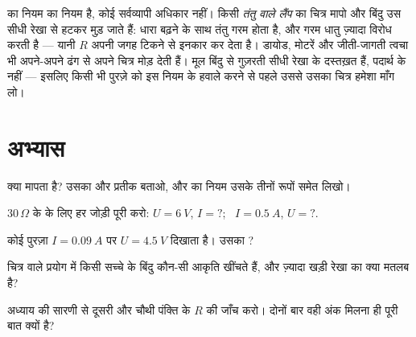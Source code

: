 \begin{remark}[नियम का राज कहाँ ख़त्म होता है]\label{rem:g8:ohms-law:limits}
 का नियम  का नियम है, कोई सर्वव्यापी अधिकार नहीं। किसी
\emph{तंतु वाले लैंप} का चित्र मापो और बिंदु उस सीधी रेखा से हटकर मुड़
जाते हैं: धारा बढ़ने के साथ तंतु गरम होता है, और गरम धातु ज़्यादा
विरोध करती है --- यानी $R$ अपनी जगह टिकने से इनकार कर देता है।
डायोड, मोटरें और जीती-जागती त्वचा भी अपने-अपने ढंग से अपने चित्र मोड़
देती हैं। मूल बिंदु से गुज़रती सीधी रेखा  के दस्तख़त हैं,
पदार्थ के नहीं --- इसलिए किसी भी पुरज़े को इस नियम के हवाले करने से
पहले उससे उसका चित्र हमेशा माँग लो।
\end{remark}

\section{अभ्यास}

\begin{exercise}[$\star$]\label{exo:g8:ohms-law:1}
 क्या मापता है? उसका  और प्रतीक बताओ, और  का नियम
उसके तीनों रूपों समेत लिखो।
\end{exercise}

\begin{exercise}[$\star$]\label{exo:g8:ohms-law:2}
$30\,\Omega$ के  के लिए हर जोड़ी पूरी करो: $U =
\qty{6}{V}$, $I = {?}$; \ $I = \qty{0.5}{A}$, $U = {?}$.
\end{exercise}

\begin{exercise}[$\star$]\label{exo:g8:ohms-law:3}
कोई पुरज़ा $I = \qty{0.09}{A}$ पर $U = \qty{4.5}{V}$ दिखाता है।
उसका ?
\end{exercise}

\begin{exercise}[$\star$]\label{exo:g8:ohms-law:4}
चित्र वाले प्रयोग में किसी सच्चे  के बिंदु कौन-सी आकृति
खींचते हैं, और ज़्यादा खड़ी रेखा का क्या मतलब है?
\end{exercise}

\begin{exercise}[$\star$]\label{exo:g8:ohms-law:5}
अध्याय की सारणी से दूसरी और चौथी पंक्ति के $R$ की जाँच करो। दोनों बार
वही अंक मिलना ही पूरी बात क्यों है?
\end{exercise}

